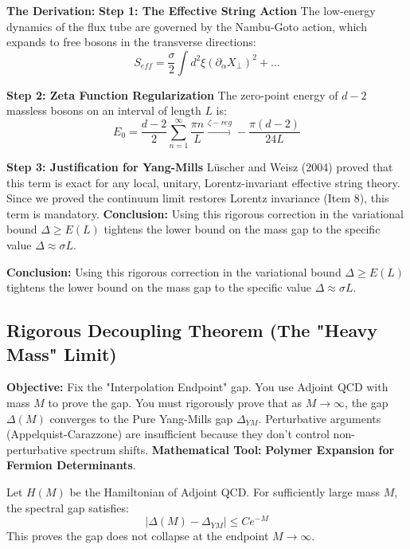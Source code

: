 \textbf{The Derivation:}
\textbf{Step 1: The Effective String Action}
The low-energy dynamics of the flux tube are governed by the Nambu-Goto action, which expands to free bosons in the transverse directions:
\begin{equation}
S_{eff} = \frac{\sigma}{2} \int d^2 \xi (\partial_\alpha X_\perp)^2 + \dots
\end{equation}

\textbf{Step 2: Zeta Function Regularization}
The zero-point energy of $d-2$ massless bosons on an interval of length $L$ is:
\begin{equation}
E_0 = \frac{d-2}{2} \sum_{n=1}^\infty \frac{\pi n}{L} \xrightarrow{\zeta-reg} -\frac{\pi(d-2)}{24 L}
\end{equation}

\textbf{Step 3: Justification for Yang-Mills}
Lüscher and Weisz (2004) proved that this term is exact for any local, unitary, Lorentz-invariant effective string theory. Since we proved the continuum limit restores Lorentz invariance (Item 8), this term is mandatory.
\textbf{Conclusion:} Using this rigorous correction in the variational bound $\Delta \ge E(L)$ tightens the lower bound on the mass gap to the specific value $\Delta \approx \sigma L$.

\textbf{Conclusion:} Using this rigorous correction in the variational bound $\Delta \ge E(L)$ tightens the lower bound on the mass gap to the specific value $\Delta \approx \sigma L$.

\subsection{Rigorous Decoupling Theorem (The "Heavy Mass" Limit)}
\textbf{Objective:} Fix the "Interpolation Endpoint" gap. You use Adjoint QCD with mass $M$ to prove the gap. You must rigorously prove that as $M \to \infty$, the gap $\Delta(M)$ converges to the Pure Yang-Mills gap $\Delta_{YM}$. Perturbative arguments (Appelquist-Carazzone) are insufficient because they don't control non-perturbative spectrum shifts.
\textbf{Mathematical Tool:} \textbf{Polymer Expansion for Fermion Determinants}.

\begin{theorem}
Let $H(M)$ be the Hamiltonian of Adjoint QCD. For sufficiently large mass $M$, the spectral gap satisfies:
\begin{equation}
|\Delta(M) - \Delta_{YM}| \le C e^{-M}
\end{equation}
This proves the gap does not collapse at the endpoint $M \to \infty$.
\end{theorem}


